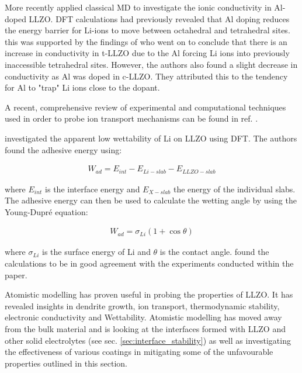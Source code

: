\documentclass[../main.tex]{subfiles}
\begin{document}
More recently \citeauthor{Bonilla2019} applied classical MD to investigate the ionic conductivity in Al-doped LLZO.\cite{Bonilla2019} DFT calculations had previously revealed that Al doping reduces the energy barrier for Li-ions to move between octahedral and tetrahedral sites.\cite{Rettenwander2014, Rettenwander2016} this was supported by the findings of \citeauthor{Bonilla2019} who went on to conclude that there is an increase in conductivity in t-LLZO due to the Al forcing Li ions into previously inaccessible tetrahedral sites. However, the authors also found a slight decrease in conductivity as Al was doped in c-LLZO. They attributed this to the tendency for Al to "trap" Li ions close to the dopant.

A recent, comprehensive review of experimental and computational techniques used in order to probe ion transport mechanisms can be found in ref. .

\citeauthor{Sharafi2017} investigated the apparent low wettability of Li  on LLZO using DFT.\cite{Sharafi2017} The authors found the adhesive energy using:

\begin{gather}\label{eq:adhesive_energy}
    W_{ad}=E_{int}-E_{Li-slab}-E_{LLZO-slab}
\end{gather}

where $E_{int}$ is the interface energy and $E_{X-slab}$ the energy of the individual slabs. The adhesive energy can then be used to calculate the wetting angle by using the Young-Dupr\'e equation:

\begin{gather}\label{eq:young_dupre}
     W_{ad}=\sigma_{Li}(1+\cos{\theta})
\end{gather}

where $\sigma_{Li}$ is the surface energy of Li and $\theta$ is the contact angle. \citeauthor{Sharafi2017} found the calculations to be in good agreement with the experiments conducted within the paper.

Atomistic modelling has proven useful in probing the properties of LLZO. It has revealed insights in dendrite growth, ion transport, thermodynamic stability, electronic conductivity and Wettability. Atomistic modelling has moved away from the bulk material and is looking at the interfaces formed with LLZO and other solid electrolytes (see sec. \ref{sec:interface_stability}) as well as investigating the effectiveness of various coatings in mitigating some of the unfavourable properties outlined in this section. 
\end{document}
